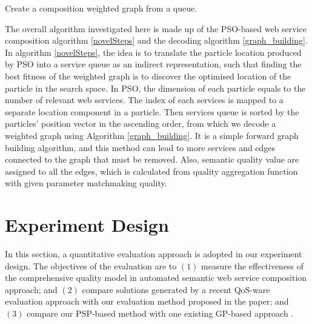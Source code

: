 \documentclass{llncs}
\begin{document}
\begin{algorithm}
 \setlength{}
 \LinesNumbered
 \SetNlSty{}{}{:}
 \caption{Create a composition weighted graph from a queue.}
\label{graph_building}
\end{algorithm} 


The overall algorithm investigated here is made up of the PSO-based web service composition algorithm \ref{novelSteps} and the decoding algorithm \ref{graph_building}. In algorithm \ref{novelSteps}, the idea is to translate the particle location produced by PSO into a service queue as an indirect representation, such that finding the best fitness of the weighted graph is to discover the optimised location of the particle in the search space. In PSO, the dimension of each particle equals to the number of relevant web services. The index of each services is mapped to a separate location component in a particle. Then services queue is sorted by the particles' position vector in the ascending order, from which we decode a weighted graph using Algorithm \ref{graph_building}. It is a simple forward graph building algorithm, and this method can lead to more services and edges connected to the graph that must be removed. Also, semantic quality value are assigned to all the edges, which is calculated from quality aggregation function with given parameter matchmaking quality.


\section{Experiment Design}\label{experiment_design}
In this section, a quantitative evaluation approach is adopted in our experiment design. The objectives of the evaluation are to $(1)$ measure the effectiveness of the comprehensive quality model in automated semantic web service composition approach; and $(2)$ compare solutions generated by a recent QoS-ware evaluation approach \cite{ma2015hybrid,da2016genetic} with our evaluation method proposed in the paper; and $(3)$ compare our PSP-based method with one existing GP-based approach \cite{ma2015hybrid}.
\end{document}
